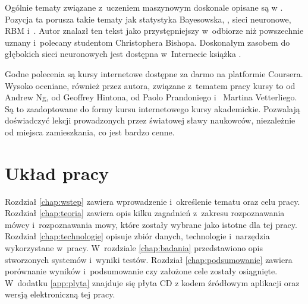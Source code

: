 Ogólnie tematy związane z~uczeniem maszynowym doskonale opisane są w
\cite{patternClassification}. Pozycja ta porusza takie tematy jak statystyka Bayesowska,
, sieci neuronowe, RBM
i~. Autor znalazł ten tekst jako przystępniejszy w~odbiorze niż powszechnie
uznany i~polecany studentom  Christophera Bishopa.
Doskonałym zasobem do głębokich sieci neuronowych jest dostępna w~Internecie książka
\cite{deeplearningbook}.

Godne polecenia są kursy internetowe dostępne za darmo na platformie Coursera.
Wysoko oceniane, również przez autora, związane z~tematem pracy kursy to
 od Andrew Ng,
 od Geoffrey Hintona,
 od Paolo Prandoniego i~ Martina Vetterliego.
Są to zaadoptowane do formy kursu internetowego kursy akademickie. Pozwalają
doświadczyć lekcji prowadzonych przez światowej sławy naukowców, niezależnie
od miejsca zamieszkania, co jest bardzo cenne.

\section{Układ pracy}\label{sec:uklad_pracy}

Rozdział \ref{chap:wstep} zawiera wprowadzenie i~określenie tematu oraz celu
pracy. Rozdział \ref{chap:teoria} zawiera opis kilku zagadnień z~zakresu
rozpoznawania mówcy i~rozpoznawania mowy, które zostały wybrane jako
istotne dla tej pracy. Rozdział \ref{chap:technologie}
opisuje zbiór danych, technologie i~narzędzia wykorzystane w~pracy. W~rozdziale
\ref{chap:badania} przedstawiono opis stworzonych systemów i~wyniki testów. Rozdział
\ref{chap:podsumowanie} zawiera porównanie wyników i~podsumowanie czy założone
cele zostały osiągnięte. W~dodatku \ref{app:plyta} znajduje się płyta CD z
kodem źródłowym aplikacji oraz wersją elektroniczną tej pracy.

